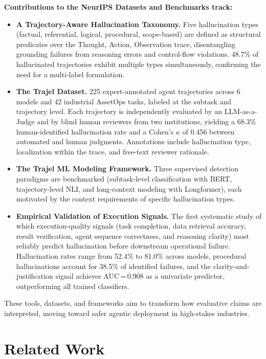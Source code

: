 \documentclass{article}
\begin{document}
\textbf{Contributions to the NeurIPS Datasets and Benchmarks track:}
\begin{itemize}
    \item \textbf{A Trajectory-Aware Hallucination Taxonomy.} Five hallucination types (factual, referential, logical, procedural, scope-based) are defined as structural predicates over the Thought, Action, Observation trace, disentangling grounding failures from reasoning errors and control-flow violations. 48.7\% of hallucinated trajectories exhibit multiple types simultaneously, confirming the need for a multi-label formulation.
    \item \textbf{The Trajel Dataset.} 225 expert-annotated agent trajectories across 6 models and 42 industrial AssetOps tasks, labeled at the subtask and trajectory level. Each trajectory is independently evaluated by an LLM-as-a-Judge and by blind human reviewers from two institutions, yielding a 68.3\% human-identified hallucination rate and a Cohen's $\kappa$ of 0.456 between automated and human judgments. Annotations include hallucination type, localization within the trace, and free-text reviewer rationale.
    \item \textbf{The Trajel ML Modeling Framework.} Three supervised detection paradigms are benchmarked (subtask-level classification with BERT, trajectory-level NLI, and long-context modeling with Longformer), each motivated by the context requirements of specific hallucination types.
    \item \textbf{Empirical Validation of Execution Signals.} The first systematic study of which execution-quality signals (task completion, data retrieval accuracy, result verification, agent sequence correctness, and reasoning clarity) most reliably predict hallucination before downstream operational failure. Hallucination rates range from 52.4\% to 81.0\% across models, procedural hallucinations account for 38.5\% of identified failures, and the clarity-and-justification signal achieves AUC\,=\,0.908 as a univariate predictor, outperforming all trained classifiers.
\end{itemize}
These tools, datasets, and frameworks aim to transform how evaluative claims are interpreted, moving toward safer agentic deployment in high-stakes industries.

\section{Related Work}
\label{sec:related_work}
\end{document}
